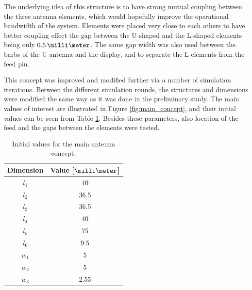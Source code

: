 The underlying idea of this structure is to have strong mutual coupling between the three antenna elements, which would hopefully improve the operational bandwidth of the system. Elements were placed very close to each others to have better coupling effect the gap between the U-shaped and the L-shaped elements being only $0.5\,\milli\meter$. The same gap width was also used between the barbs of the U-antenna and the display, and to separate the L-elements from the feed pin.

This concept was improved and modified further via a number of simulation iterations. Between the different simulation rounds, the structures and dimensions were modified the same way as it was done in the preliminary study. The main values of interest are illustrated in Figure \ref{fig:main_concept}, and their initial values can be seen from Table \ref{tab:initial_concept}. Besides these parameters, also location of the feed and the gaps between the elements were tested. 
\begin{table}[H]
    \centering
    \caption{Initial values for the main antenna concept.}
    \label{tab:initial_concept}
    \begin{tabular}{|c|c|}
        \hline
        \textbf{Dimension} & \textbf{Value [$\milli\meter$]} \\
        \hline
        $l_1$ & 40\\
        \hline
        $l_2$ & 36.5\\
        \hline
        $l_3$ & 36.5\\
        \hline
        $l_4$ & 40\\
        \hline
        $l_5$ & 75\\
        \hline
        $l_6$ & 9.5\\
        \hline
        $w_1$ & 5\\
        \hline
        $w_2$ & 5\\
        \hline
        $w_3$ & 2.55\\
        \hline
    \end{tabular}
\end{table}

